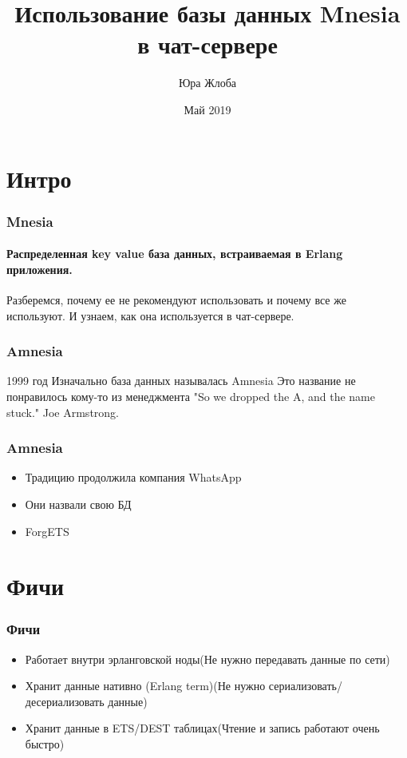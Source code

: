 \documentclass[9pt]{beamer}
\title{Использование базы данных Mnesia в чат-сервере}
\author{Юра Жлоба}
\institute{Wargaming.net}
\date{Май 2019}
\begin{document}
\maketitle

\section{Интро}

\begin{frame}
  \frametitle{Mnesia}
  \framesubtitle{Распределенная key value база данных, встраиваемая в Erlang приложения.}
  Разберемся, почему ее не рекомендуют использовать и почему все же используют.\newline
  И узнаем, как она используется в чат-сервере.
\end{frame}

\begin{frame}
  \frametitle{Amnesia}
1999 год
Изначально база данных называлась Amnesia
Это название не понравилось кому-то из менеджмента
"So we dropped the A, and the name stuck." Joe Armstrong.
\end{frame}

\begin{frame}
  \frametitle{Amnesia}
  \begin{itemize}
  \item Традицию продолжила компания WhatsApp
    \pause
  \item Они назвали свою БД
    \pause
  \item ForgETS
  \end{itemize}
\end{frame}

\section{Фичи}

\begin{frame}
  \frametitle{Фичи}
  \begin{itemize}[<+->]
  \item Работает внутри эрланговской ноды\newline(Не нужно передавать данные по сети)
  \item Хранит данные нативно (Erlang term)\newline(Не нужно сериализовать/десериализовать данные)
  \item Хранит данные в ETS/DEST таблицах\newline(Чтение и запись работают очень быстро)
  \end{itemize}
\end{frame}
\end{document}
